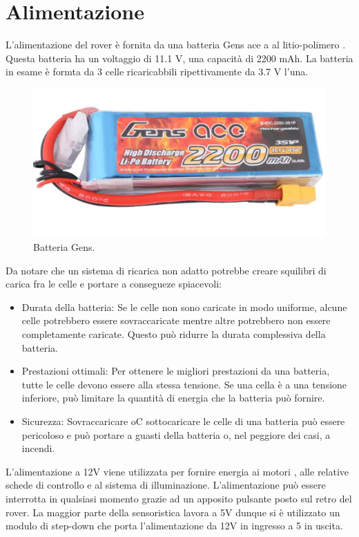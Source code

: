 \documentclass{article}
\begin{document}
\newpage

\section{Alimentazione}
L'alimentazione del rover è fornita da una batteria Gens ace a al litio-polimero . Questa batteria ha un voltaggio di 11.1 V, una capacità di 2200 mAh. La batteria in esame è formta da 3 celle ricaricabbili ripettivamente da 3.7 V l'una.
\begin{figure}[H]
\centering
\includegraphics[width=0.7\linewidth]{image/batteria.png}
\caption{\label{fig:batteria}Batteria Gens.}
\end{figure}
Da notare che un sistema di ricarica non adatto potrebbe creare squilibri di carica fra le celle e portare a consegueze spiacevoli: 
\begin{itemize}
\item Durata della batteria: Se le celle non sono caricate in modo uniforme, alcune celle potrebbero essere sovraccaricate mentre altre potrebbero non essere completamente caricate. Questo può ridurre la durata complessiva della batteria. 
\item  Prestazioni ottimali: Per ottenere le migliori prestazioni da una batteria, tutte le celle devono essere alla stessa tensione. Se una cella è a una tensione inferiore, può limitare la quantità di energia che la batteria può fornire.
\item Sicurezza: Sovraccaricare oC sottocaricare le celle di una batteria può essere pericoloso e può portare a guasti della batteria o, nel peggiore dei casi, a incendi.
\end{itemize}
L'alimentazione a 12V viene utilizzata per fornire energia ai motori , alle relative schede di controllo e al sistema di illuminazione.
L'alimentazione può essere interrotta in qualsiasi momento grazie ad un apposito pulsante posto sul retro del rover.
La maggior parte della sensoristica lavora a 5V dunque si è utilizzato un modulo di step-down che porta l'alimentazione da 12V in ingresso a 5 in uscita.
\end{document}
